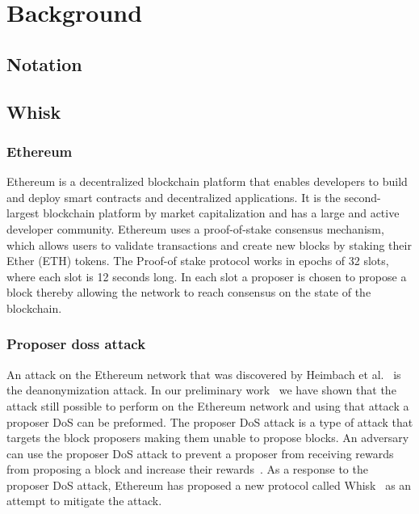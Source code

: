 
\section{Background}\label{sec:background}


\subsection{Notation}\label{sec:background-notation}


\subsection{Whisk}\label{sec:related-work-whisk}

\subsubsection{Ethereum}\label{sec:background-ethereum}
Ethereum is a decentralized blockchain platform that enables developers to build and deploy smart contracts and decentralized applications.
It is the second-largest blockchain platform by market capitalization and has a large and active developer community.
Ethereum uses a proof-of-stake consensus mechanism, which allows users to validate transactions and create new blocks by staking their Ether (ETH) tokens.
The Proof-of stake protocol works in epochs of 32 slots, where each slot is 12 seconds long.
In each slot a proposer is chosen to propose a block thereby allowing the network to reach consensus on the state of the blockchain.

\subsubsection{Proposer doss attack}\label{sec:background-proposer-doss-attacks}
An attack on the Ethereum network that was discovered by Heimbach et al.~\cite{heimbach2024deanonymizingethereumvalidatorsp2p} is the deanonymization attack.
In our preliminary work~\cite{ouroldpaper} we have shown that the attack still possible to perform on the Ethereum network and using that attack a proposer DoS can be preformed.
The proposer DoS attack is a type of attack that targets the block proposers making them unable to propose blocks.
An adversary can use the proposer DoS attack to prevent a proposer from receiving rewards from proposing a block and increase their rewards~\cite{EthereumSSLE2024}.
As a response to the proposer DoS attack, Ethereum has proposed a new protocol called Whisk~\cite{Whisk2024} as an attempt to mitigate the attack.

